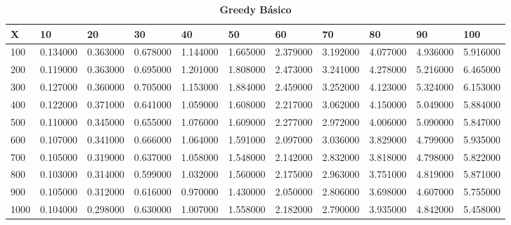 \documentclass[10pt,letterpaper]{article}
\begin{document}
\begin{center}
\begin{table}\renewcommand{\arraystretch}{2.5}
\caption{\large \textbf{Greedy Básico}}
\centering
\begin{tabular} { |m{0.5cm}|m{1.3cm}|m{1.3cm}|m{1.3cm}|m{1.3cm}|m{1.3cm}|m{1.3cm}|m{1.3cm}|m{1.3cm}|m{1.3cm}|m{1.3cm}|} 
\hline
\rowcolor{Gray}
\centering \textbf{X} & \centering \textbf{10} & \centering \textbf{20} & \centering \textbf{30}\ & \centering \textbf{40} & \centering \textbf{50} & \centering \textbf{60}\ & \centering \textbf{70} & \centering \textbf{80} & \centering \textbf{90}\ & \textbf{100} \\\hline
\cellcolor{Gray}100 & 0.134000 & 0.363000 & 0.678000 & 1.144000 & 1.665000 & 2.379000 & 3.192000 & 4.077000 & 4.936000 & 5.916000 \\
\hline
\cellcolor{Gray}200 & 0.119000 & 0.363000 & 0.695000 & 1.201000 & 1.808000 & 2.473000 & 3.241000 & 4.278000 & 5.216000 & 6.465000 \\
\hline
\cellcolor{Gray}300 & 0.127000 & 0.360000 & 0.705000 & 1.153000 & 1.884000 & 2.459000 & 3.252000 & 4.123000 & 5.324000 & 6.153000 \\
\hline
\cellcolor{Gray}400 & 0.122000 & 0.371000 & 0.641000 & 1.059000 & 1.608000 & 2.217000 & 3.062000 & 4.150000 & 5.049000 & 5.884000 \\
\hline
\cellcolor{Gray}500 & 0.110000 & 0.345000 & 0.655000 & 1.076000 & 1.609000 & 2.277000 & 2.972000 & 4.006000 & 5.090000 & 5.847000 \\
\hline
\cellcolor{Gray}600 & 0.107000 & 0.341000 & 0.666000 & 1.064000 & 1.591000 & 2.097000 & 3.036000 & 3.829000 & 4.799000 & 5.935000 \\
\hline
\cellcolor{Gray}700 & 0.105000 & 0.319000 & 0.637000 & 1.058000 & 1.548000 & 2.142000 & 2.832000 & 3.818000 & 4.798000 & 5.822000 \\
\hline
\cellcolor{Gray}800 & 0.103000 & 0.314000 & 0.599000 & 1.032000 & 1.560000 & 2.175000 & 2.963000 & 3.751000 & 4.819000 & 5.871000 \\
\hline
\cellcolor{Gray}900 & 0.105000 & 0.312000 & 0.616000 & 0.970000 & 1.430000 & 2.050000 & 2.806000 & 3.698000 & 4.607000 & 5.755000 \\
\hline
\cellcolor{Gray}1000 & 0.104000 & 0.298000 & 0.630000 & 1.007000 & 1.558000 & 2.182000 & 2.790000 & 3.935000 & 4.842000 & 5.458000 \\
\hline
\end{tabular} \\
\end{table}
\end{center}
\end{document}
